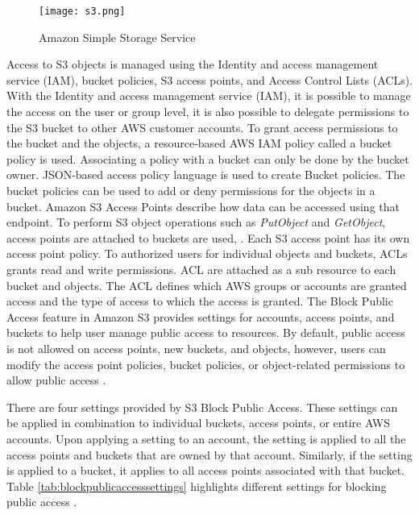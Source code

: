 {\begin{figure}
    \centering
    \texttt{[image: s3.png]}
    \caption{Amazon Simple Storage Service}
    \label{fig:s3}
\end{figure}
\par Access to S3 objects is managed using the Identity and access management service (IAM), bucket policies, S3 access points, and Access Control Lists (ACLs).
With the Identity and access management service (IAM), it is possible to manage the access on the user or group level, it is also possible to delegate permissions to the S3 bucket to other AWS customer accounts.
To grant access permissions to the bucket and the objects, a resource-based AWS IAM policy called a bucket policy is used.
Associating a policy with a bucket can only be done by
the bucket owner.
JSON-based access policy language is used to create Bucket policies.
The bucket policies can be used to add or deny permissions for the objects in a bucket.
Amazon S3 Access Points describe how data can be accessed using that endpoint.
To perform S3 object operations such as
\textit{PutObject} and \textit{GetObject}, access points are
attached to buckets are used, .
Each S3 access point has its own access point policy.
To authorized users for individual objects and buckets, ACLs grants read and write permissions.
ACL are attached as a sub resource to each bucket and objects.
The ACL defines which AWS groups or accounts are granted access and the type of access to which the access is granted.
The Block Public Access feature in Amazon S3 provides settings for accounts, access points, and buckets to help user manage public access to resources.
By default, public access is not allowed on access points, new buckets, and objects, however, users can modify the access point policies, bucket policies, or object-related permissions to allow public access \cite{36}.

\par There are four settings provided by S3 Block Public
Access.
These settings can be applied in combination to individual buckets, access points, or entire AWS accounts. Upon applying a setting to an account, the setting is applied to all the access points and buckets that are owned by that account. Similarly, if the setting is applied to a bucket, it
applies to all access points associated with that bucket. Table \ref{tab:blockpublicaccesssettings} highlights
different settings for blocking public access \cite{23}.

\clearpage

}
